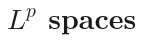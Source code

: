 \documentclass[letterpaper,10pt,english]{article}
\begin{document}
\section{$L^p$ spaces}


\end{document}
